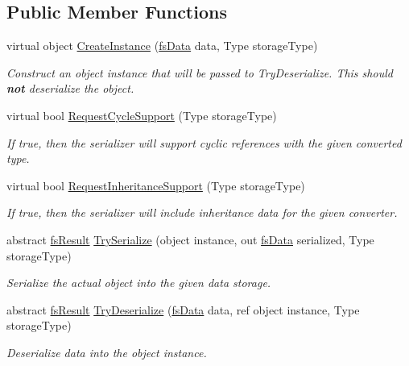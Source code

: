 \subsection*{Public Member Functions}
\begin{DoxyCompactItemize}
\item 
virtual object \hyperlink{class_full_serializer_1_1fs_base_converter_a415ea2ac9429bbb9927346af7cb7c2e1}{Create\+Instance} (\hyperlink{class_full_serializer_1_1fs_data}{fs\+Data} data, Type storage\+Type)
\begin{DoxyCompactList}\small\item\em Construct an object instance that will be passed to Try\+Deserialize. This should {\bfseries not} deserialize the object. \end{DoxyCompactList}\item 
virtual bool \hyperlink{class_full_serializer_1_1fs_base_converter_a4e850ab88cea1b89771c00e0b65febcd}{Request\+Cycle\+Support} (Type storage\+Type)
\begin{DoxyCompactList}\small\item\em If true, then the serializer will support cyclic references with the given converted type. \end{DoxyCompactList}\item 
virtual bool \hyperlink{class_full_serializer_1_1fs_base_converter_a84447285540ab6b51efc2399d144c60c}{Request\+Inheritance\+Support} (Type storage\+Type)
\begin{DoxyCompactList}\small\item\em If true, then the serializer will include inheritance data for the given converter. \end{DoxyCompactList}\item 
abstract \hyperlink{struct_full_serializer_1_1fs_result}{fs\+Result} \hyperlink{class_full_serializer_1_1fs_base_converter_aeb0065770e53ecaac3f5dd3b5cd670d1}{Try\+Serialize} (object instance, out \hyperlink{class_full_serializer_1_1fs_data}{fs\+Data} serialized, Type storage\+Type)
\begin{DoxyCompactList}\small\item\em Serialize the actual object into the given data storage. \end{DoxyCompactList}\item 
abstract \hyperlink{struct_full_serializer_1_1fs_result}{fs\+Result} \hyperlink{class_full_serializer_1_1fs_base_converter_a38d3d1b042eb788819883354073a224e}{Try\+Deserialize} (\hyperlink{class_full_serializer_1_1fs_data}{fs\+Data} data, ref object instance, Type storage\+Type)
\begin{DoxyCompactList}\small\item\em Deserialize data into the object instance. \end{DoxyCompactList}\end{DoxyCompactItemize}
